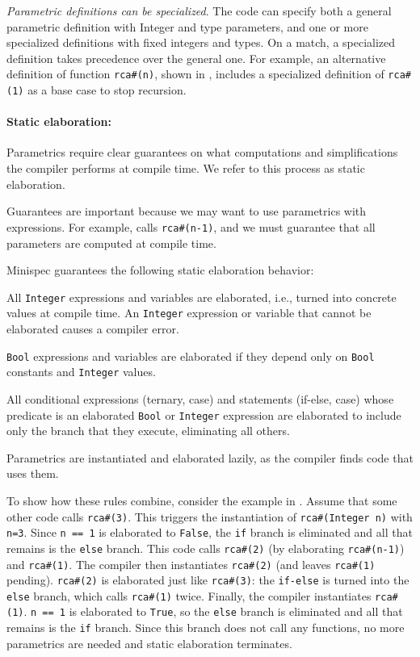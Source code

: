 \emph{Parametric definitions can be specialized}.
The code can specify both a general parametric definition with Integer and type parameters,
and one or more specialized definitions with fixed integers and types.
On a match, a specialized definition takes precedence over the general one.
For example, an alternative definition of function \texttt{rca\#(n)}, shown in ,
includes a specialized definition of \texttt{rca\#(1)} as a base case to stop recursion.

\paragraph{Static elaboration:} Parametrics require clear guarantees on what computations
and simplifications the compiler performs at compile time.
We refer to this process as static elaboration.

Guarantees are important because we may want to use parametrics with expressions.
For example,  calls \texttt{rca\#(n-1)},
and we must guarantee that all parameters are computed at compile time.

Minispec guarantees the following static elaboration behavior:
\begin{compactenum}
\item All \texttt{Integer} expressions and variables are elaborated, i.e., turned into concrete values at compile time.
  An \texttt{Integer} expression or variable that cannot be elaborated causes a compiler error.
\item \texttt{Bool} expressions and variables are elaborated if they depend only on \texttt{Bool} constants and \texttt{Integer} values.
\item All conditional expressions (ternary, case) and statements (if-else, case)
  whose predicate is an elaborated \texttt{Bool} or \texttt{Integer} expression are
  elaborated to include only the branch that they execute, eliminating all others.
\item Parametrics are instantiated and elaborated lazily, as the compiler finds code that uses them.
\end{compactenum}

To show how these rules combine, consider the example in
.
Assume that some other code calls \verb|rca#(3)|.
This triggers the instantiation of \verb|rca#(Integer n)| with \verb|n=3|.
Since \verb|n == 1| is elaborated to \verb|False|, the \verb|if| branch is eliminated and all that remains is
the \verb|else| branch.
This code calls \verb|rca#(2)| (by elaborating \verb|rca#(n-1)|) and \verb|rca#(1)|.
The compiler then instantiates \verb|rca#(2)| (and leaves \verb|rca#(1)| pending).
\verb|rca#(2)| is elaborated just like \verb|rca#(3)|: the \verb|if-else| is turned into the \verb|else| branch,
which calls \verb|rca#(1)| twice.
Finally, the compiler instantiates \verb|rca#(1)|.
\verb|n == 1| is elaborated to \verb|True|, so the \verb|else| branch is eliminated and all that remains is the
\verb|if| branch. Since this branch does not call any functions,
no more parametrics are needed and static elaboration terminates.

